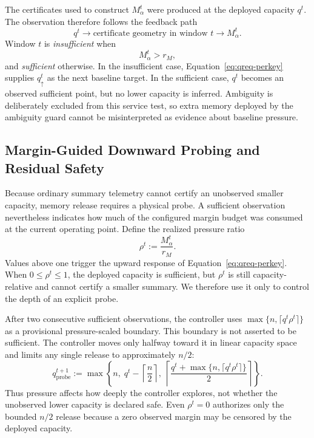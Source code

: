 \documentclass[sigconf, nonacm]{acmart}
\begin{document}
The certificates used to construct \(M_\alpha^t\) were produced at the deployed capacity \(q^t\). The observation therefore follows the feedback path
\[
q^t
\longrightarrow
\text{certificate geometry in window }t
\longrightarrow
M_\alpha^t.
\]
Window \(t\) is \emph{insufficient} when
\begin{equation}
\label{eq:capacity-insufficient}
M_\alpha^t>r_M,
\end{equation}
and \emph{sufficient} otherwise. In the insufficient case,
Equation~\eqref{eq:qreq-perkey} supplies \(q_\uparrow^t\) as the next baseline
target. In the sufficient case, \(q^t\) becomes an observed sufficient point,
but no lower capacity is inferred. Ambiguity is deliberately excluded from
this service test, so extra memory deployed by the ambiguity guard cannot be
misinterpreted as evidence about baseline pressure.

\subsection{Margin-Guided Downward Probing and Residual Safety}
\label{subsec:pred-calibration}

Because ordinary summary telemetry cannot certify an unobserved smaller capacity, memory release requires a physical probe. A sufficient observation nevertheless indicates how much of the configured margin budget was consumed at the current operating point. Define the realized pressure ratio
\begin{equation}
\label{eq:probe-pressure}
\rho^t:=\frac{M_\alpha^t}{r_M}.
\end{equation}
Values above one trigger the upward response of Equation~\eqref{eq:qreq-perkey}. When \(0\leq\rho^t\leq1\), the deployed capacity is sufficient, but \(\rho^t\) is still capacity-relative and cannot certify a smaller summary. We therefore use it only to control the depth of an explicit probe.

After two consecutive sufficient observations, the controller uses
\(\max\{n,\lceil q^t\rho^t\rceil\}\) as a provisional pressure-scaled boundary.
This boundary is not asserted to be sufficient. The controller moves only
halfway toward it in linear capacity space and limits any single release to
approximately \(n/2\):
\begin{equation}
\label{eq:comfort-probe}
q_{\mathrm{probe}}^{t+1}
:=
\max\!\left\{
n,\;
q^t-\left\lceil\frac{n}{2}\right\rceil,\;
\left\lceil
\frac{q^t+\max\{n,\lceil q^t\rho^t\rceil\}}{2}
\right\rceil
\right\}.
\end{equation}
Thus pressure affects how deeply the controller explores, not whether the unobserved lower capacity is declared safe. Even \(\rho^t=0\) authorizes only the bounded \(n/2\) release because a zero observed margin may be censored by the deployed capacity.
\end{document}
